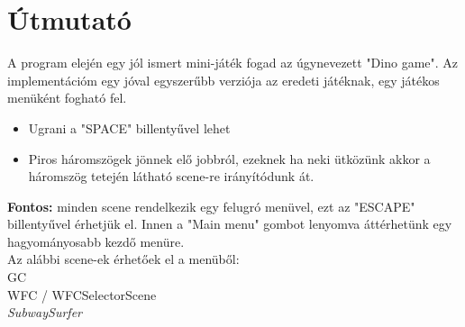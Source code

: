 \chapter{Útmutató}
\label{Utmutato}
A program elején egy jól ismert mini-játék fogad az úgynevezett "Dino game". Az implementációm egy jóval egyszerűbb verziója az eredeti játéknak, egy játékos menüként fogható fel.
\begin{itemize}
    \label{item:dino-runner-utmutato}
        \item Ugrani a "SPACE" billentyűvel lehet
        \item Piros háromszögek jönnek elő jobbról, ezeknek ha neki ütközünk akkor a háromszög tetején látható scene-re irányítódunk át.
\end{itemize}
\textbf{Fontos:} minden scene rendelkezik egy felugró menüvel, ezt az "ESCAPE" billentyűvel érhetjük el. Innen a "Main menu" gombot lenyomva áttérhetünk egy hagyományosabb kezdő menüre.\\
Az alábbi scene-ek érhetőek el a menüből:\\
GC\\
WFC / WFCSelectorScene\\
\textit{SubwaySurfer}
